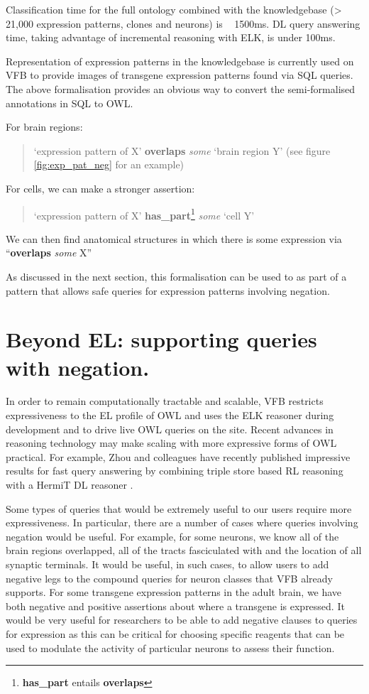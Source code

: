 \documentclass[runningheads,a4paper]{llncs}
\begin{document}
Classification time for the full ontology combined with the
knowledgebase (> 21,000 expression patterns, clones and neurons) is  ~
1500ms.  DL query answering time, taking advantage of incremental
reasoning with ELK, is under 100ms.

Representation of expression patterns in the knowledgebase is
currently used on VFB to provide images of transgene
expression patterns found via SQL queries. The above formalisation
provides an obvious way to convert the semi-formalised annotations in
SQL to OWL.

For brain regions:

\begin{quote}`expression pattern of X' \textbf{overlaps} \textit{some} `brain
region Y'  (see figure \ref{fig:exp_pat_neg} for an example)\end{quote}

For cells, we can make a stronger assertion:

\begin{quote}`expression pattern of X'
\textbf{has\_part}\footnote{\textbf{has\_part} entails \textbf{overlaps}} \textit{some} `cell Y' \end{quote}

We can then find anatomical structures in which there is some
expression via ``\textbf{overlaps} \textit{some} X''

As discussed in the next section, this formalisation can be used to as
part of a pattern that allows safe queries for expression patterns involving negation.

\section{Beyond EL: supporting queries with negation.}

In order to remain computationally tractable and scalable, VFB
restricts expressiveness to the EL profile of OWL and uses the ELK
reasoner \cite{kazakov2012elk} during development and to drive live
OWL queries on the site. Recent advances in reasoning
technology may make scaling with more expressive forms of OWL
practical. For example, Zhou and colleagues have recently published
impressive results for fast query answering by combining triple store
based RL reasoning with a HermiT DL reasoner \cite{ZNCH14a}.

Some types of queries that would be extremely useful to our users
require more expressiveness.  In particular, there are a number of
cases where queries involving negation would be useful.  For example,
for some neurons, we know all of the brain regions overlapped, all of
the tracts fasciculated with and the location of all synaptic
terminals.  It would be useful, in such cases, to allow users to add
negative legs to the compound queries for neuron classes that VFB
already supports.  For some transgene expression
patterns in the adult brain, we have both negative and positive
assertions about where a transgene is expressed.  It would be very
useful for researchers to be able to add negative clauses to queries for
expression as this can be critical for choosing
specific reagents that can be used to modulate the activity of particular neurons
to assess their function.
\end{document}
